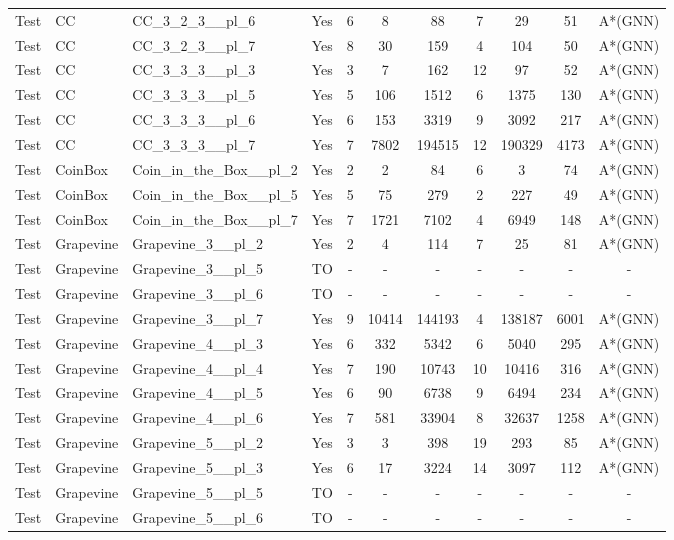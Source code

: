 \documentclass{article}
\begin{document}
\begin{tabular}{lllcccccccc}
Test & CC & CC\_3\_2\_3\_\_pl\_6 & Yes & 6 & 8 & 88 & 7 & 29 & 51 & A*(GNN) \\
Test & CC & CC\_3\_2\_3\_\_pl\_7 & Yes & 8 & 30 & 159 & 4 & 104 & 50 & A*(GNN) \\
Test & CC & CC\_3\_3\_3\_\_pl\_3 & Yes & 3 & 7 & 162 & 12 & 97 & 52 & A*(GNN) \\
Test & CC & CC\_3\_3\_3\_\_pl\_5 & Yes & 5 & 106 & 1512 & 6 & 1375 & 130 & A*(GNN) \\
Test & CC & CC\_3\_3\_3\_\_pl\_6 & Yes & 6 & 153 & 3319 & 9 & 3092 & 217 & A*(GNN) \\
Test & CC & CC\_3\_3\_3\_\_pl\_7 & Yes & 7 & 7802 & 194515 & 12 & 190329 & 4173 & A*(GNN) \\
Test & CoinBox & Coin\_in\_the\_Box\_\_pl\_2 & Yes & 2 & 2 & 84 & 6 & 3 & 74 & A*(GNN) \\
Test & CoinBox & Coin\_in\_the\_Box\_\_pl\_5 & Yes & 5 & 75 & 279 & 2 & 227 & 49 & A*(GNN) \\
Test & CoinBox & Coin\_in\_the\_Box\_\_pl\_7 & Yes & 7 & 1721 & 7102 & 4 & 6949 & 148 & A*(GNN) \\
Test & Grapevine & Grapevine\_3\_\_pl\_2 & Yes & 2 & 4 & 114 & 7 & 25 & 81 & A*(GNN) \\
Test & Grapevine & Grapevine\_3\_\_pl\_5 & TO & - & - & - & - & - & - & - \\
Test & Grapevine & Grapevine\_3\_\_pl\_6 & TO & - & - & - & - & - & - & - \\
Test & Grapevine & Grapevine\_3\_\_pl\_7 & Yes & 9 & 10414 & 144193 & 4 & 138187 & 6001 & A*(GNN) \\
Test & Grapevine & Grapevine\_4\_\_pl\_3 & Yes & 6 & 332 & 5342 & 6 & 5040 & 295 & A*(GNN) \\
Test & Grapevine & Grapevine\_4\_\_pl\_4 & Yes & 7 & 190 & 10743 & 10 & 10416 & 316 & A*(GNN) \\
Test & Grapevine & Grapevine\_4\_\_pl\_5 & Yes & 6 & 90 & 6738 & 9 & 6494 & 234 & A*(GNN) \\
Test & Grapevine & Grapevine\_4\_\_pl\_6 & Yes & 7 & 581 & 33904 & 8 & 32637 & 1258 & A*(GNN) \\
Test & Grapevine & Grapevine\_5\_\_pl\_2 & Yes & 3 & 3 & 398 & 19 & 293 & 85 & A*(GNN) \\
Test & Grapevine & Grapevine\_5\_\_pl\_3 & Yes & 6 & 17 & 3224 & 14 & 3097 & 112 & A*(GNN) \\
Test & Grapevine & Grapevine\_5\_\_pl\_5 & TO & - & - & - & - & - & - & - \\
Test & Grapevine & Grapevine\_5\_\_pl\_6 & TO & - & - & - & - & - & - & - \\

\end{tabular}
\end{document}
